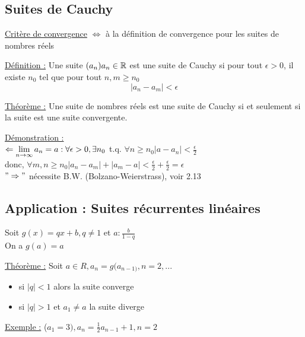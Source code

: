 \documentclass[12pt,a4paper]{article}
\begin{document}
{\subsection{Suites de Cauchy}
\underline{Critère de convergence} $\Leftrightarrow$ à la définition de convergence pour les suites de nombres réels
\begin{boite}
\underline{Définition :} Une suite $(a_n) a_n \in \mathbb{R}$ est une suite de Cauchy si pour tout $\epsilon > 0$, il existe $n_0$ tel que pour tout $n,m \geq n_0$\\
\begin{equation}
|a_n-a_m| < \epsilon
\end{equation}
\end{boite}
\begin{boite}
\underline{Théorème :} Une suite de nombres réels est une suite de Cauchy si et seulement si la suite est une suite convergente.
\end{boite}
\underline{Démonstration :}\\
$\Leftarrow \lim\limits_{n \to \infty} a_n = a: \forall \epsilon > 0, \exists n_0$ t.q. $\forall n \geq n_0 |a-a_n| < \frac{\epsilon}{2}$\\
donc, $\forall m,n \geq n_0 |a_n - a_m| + |a_m -a| < \frac{\epsilon}{2}+ \frac{\epsilon}{2} = \epsilon$\\
$"\Rightarrow"$ nécessite B.W. (Bolzano-Weierstrass), voir 2.13
\subsection{Application : Suites récurrentes linéaires} 
Soit $g(x) = qx + b, q \neq 1$ et $a:\frac{b}{1-q}$\\
On a $g(a) = a$
\begin{boite}
\underline{Théorème :} Soit $a\in R, a_n = g(a_{n-1)}, n = 2,...$
\begin{itemize}
\item si $|q| < 1$ alors la suite converge
\item si $|q| > 1$ et $a_1 \neq a$ la suite diverge
\end{itemize}
\end{boite}
\underline{Exemple :} ($a_1 = 3), a_n = \frac{1}{2} a_{n-1} + 1, n=2$

}
\end{document}
